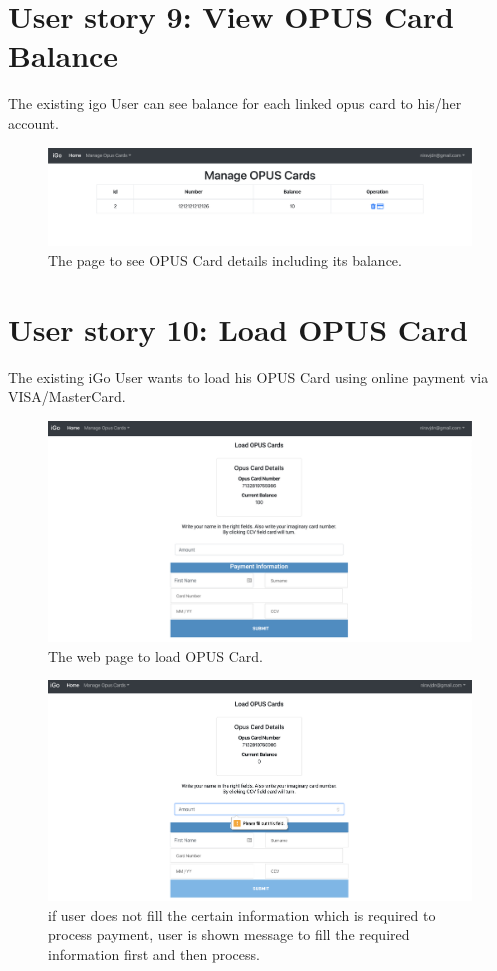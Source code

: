 \documentclass[11pt, english]{report}
\begin{document}
\section{User story 9: View OPUS Card Balance}
The existing igo User can see balance for each linked opus card to his/her account.

\begin{figure}[H]
  \includegraphics[width=1\textwidth]{images/manage_opus_card_page.png}
  \centering
  \caption{The page to see OPUS Card details including its balance.}
\end{figure}

\section{User story 10: Load OPUS Card}
The existing iGo User wants to load his OPUS Card using online payment via VISA/MasterCard.

\begin{figure}[H]
  \includegraphics[width=1\textwidth]{images/load_opus_card_page.png}
  \centering
  \caption{The web page to load OPUS Card.}
\end{figure}

\begin{figure}[H]
  \includegraphics[width=1\textwidth]{images/opus_card_load_page.png}
  \centering
  \caption{if user does not fill the certain information which is required to process payment, user is shown message to fill the required information first and then process.}
\end{figure}
\end{document}
